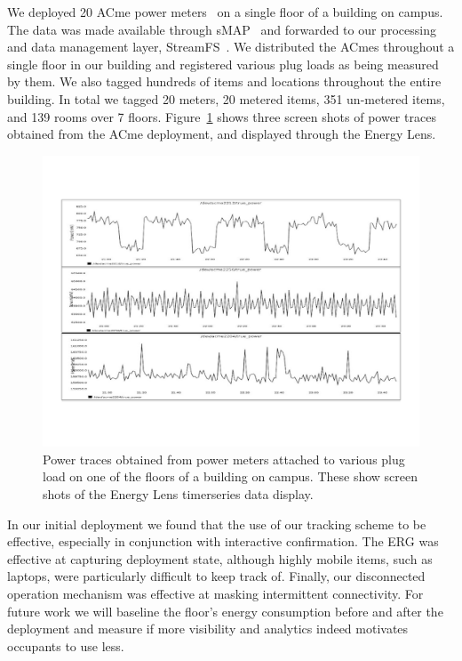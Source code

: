 We deployed 20 ACme power meters~\cite{acme} on a single floor of a building on campus.  The data was made available through
sMAP~\cite{smap} and forwarded to our processing and data management layer, StreamFS~\cite{streamfs}.  We distributed
the ACmes throughout a single floor in our building and registered various plug loads as being measured by them.  We also tagged
hundreds of items and locations throughout the entire building.  In total we tagged 20 meters, 20 metered items, 351 un-metered items,
 and 139 rooms over 7 floors.  Figure~\ref{fig:tsdata} shows three screen shots of power traces obtained from the ACme deployment, and displayed
 through the Energy Lens. 

\begin{figure}[htb!]
\begin{center}
\includegraphics[scale=0.33]{figs/graphs_screen}
\caption{Power traces obtained from power meters attached to various plug load on one of the floors of
a building on campus.  These show screen shots of the Energy Lens timerseries data display.}
\label{fig:tsdata}
\end{center}
\end{figure}

In our initial deployment we found that the use of our tracking scheme to be effective, especially in conjunction with
interactive confirmation.  The ERG was effective at capturing deployment state, although highly mobile items, such as laptops,
were particularly difficult to keep track of.  Finally, our disconnected operation mechanism was effective at masking 
intermittent connectivity.  For future work we will baseline the floor's energy consumption before and after the deployment 
and measure if more visibility and analytics indeed motivates occupants to use less.

